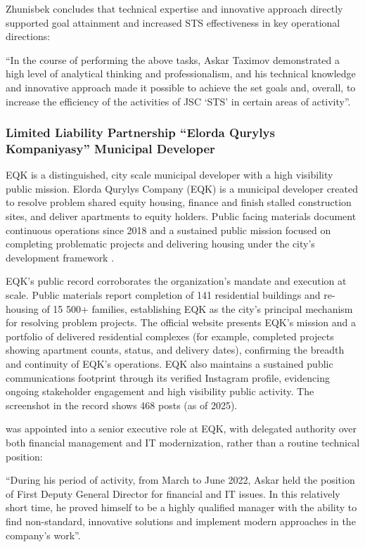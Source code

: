 Zhunisbek concludes that \mrls technical expertise and innovative approach directly supported goal attainment and increased STS effectiveness in key operational directions:
\begin{fullquote}
``In the course of performing the above tasks, Askar Taximov demonstrated a high level of analytical thinking and professionalism, and his technical knowledge and innovative approach made it possible to achieve the set goals and, overall, to increase the efficiency of the activities of JSC `STS' in certain areas of activity''.
\end{fullquote} 

\subsubsection{Limited Liability Partnership “Elorda Qurylys Kompaniyasy” Municipal Developer}

\label{subsubsec:RoleEQK}

EQK is a distinguished, city scale municipal developer with a high visibility public mission.
Elorda Qurylys Company (EQK) is a municipal developer created to resolve problem shared equity housing, finance and finish stalled construction sites, and deliver apartments to equity holders. Public facing materials document continuous operations since 2018 and a sustained public mission focused on completing problematic projects and delivering housing under the city’s development framework .

EQK’s public record corroborates the organization’s mandate and execution at scale. Public materials report completion of 141 residential buildings and re-housing of 15 500+ families, establishing EQK as the city’s principal mechanism for resolving problem projects. The official website presents EQK’s mission and a portfolio of delivered residential complexes (for example, completed projects showing apartment counts, status, and delivery dates), confirming the breadth and continuity of EQK’s operations.
EQK also maintains a sustained public communications footprint through its verified Instagram profile, evidencing ongoing stakeholder engagement and high visibility public activity. The screenshot in the record shows 468 posts (as of 2025).

\mrl{} was appointed into a senior executive role at EQK, with delegated authority over both financial management and IT modernization, rather than a routine technical position:
\begin{fullquote}
``During his period of activity, from March to June 2022, Askar held the position of First Deputy General Director for financial and IT issues. In this relatively short time, he proved himself to be a highly qualified manager with the ability to find non-standard, innovative solutions and implement modern approaches in the company’s work''.
\end{fullquote}

